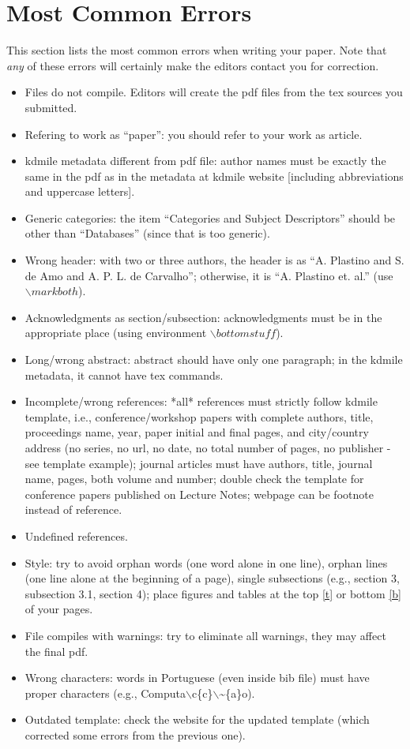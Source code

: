 \documentclass[kdmile,a4paper]{kdmile} %
\begin{document}
\section{Most Common Errors}

This section lists the most common errors when writing your paper. Note that \textit{any} of these errors will certainly make the editors contact you for correction.

\begin{itemize}
	\item Files do not compile. Editors will create the pdf files from the tex sources you submitted.
	\item Refering to work as ``paper'': you should refer to your work as article.
	\item kdmile metadata different from pdf file: author names must be exactly the same in the pdf as in the metadata at kdmile website [including abbreviations and uppercase letters].
	\item Generic categories: the item ``Categories and Subject Descriptors'' should be other than ``Databases'' (since that is too generic).
	\item Wrong header: with two or three authors, the header is as ``A. Plastino and S. de Amo and A. P. L. de Carvalho''; otherwise, it is ``A. Plastino et. al.'' (use $\backslash markboth$).
	\item Acknowledgments as section/subsection: acknowledgments must be in the appropriate place (using environment $\backslash bottomstuff$).
	\item Long/wrong abstract: abstract should have only one paragraph; in the kdmile metadata, it cannot have tex commands.
	\item Incomplete/wrong references: *all* references must strictly follow kdmile template, i.e., conference/workshop papers with complete authors, title, proceedings name, year, paper initial and final pages, and city/country address (no series, no url, no date, no total number of pages, no publisher - see template example); journal articles must have authors, title, journal name, pages, both volume and number; double check the template for conference papers published on Lecture Notes; webpage can be footnote instead of reference.
	\item Undefined references.
	\item Style: try to avoid orphan words (one word alone in one line), orphan lines (one line alone at the beginning of a page), single subsections (e.g., section 3, subsection 3.1, section 4); place figures and tables at the top \url{[t]} or bottom \url{[b]} of your pages.
	\item File compiles with warnings: try to eliminate all warnings, they may affect the final pdf.
	\item Wrong characters: words in Portuguese (even inside bib file) must have proper characters (e.g., Computa$\backslash$c\{c\}$\backslash$\textasciitilde\{a\}o).
	\item Outdated template: check the website for the updated template (which corrected some errors from the previous one).
\end{itemize}
	



\begin{received}
\end{received}
\end{document}
